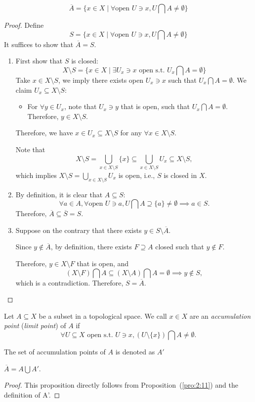 \begin{proposition}\label{pro:2:11}
\[
\overline{A}=\{x\in X\mid\forall \text{open }U\ni x, U\bigcap A\ne\emptyset\}
\]
\end{proposition}
\begin{proof}
Define
\[
S=\{x\in X\mid\forall \text{open }U\ni x, U\bigcap A\ne\emptyset\}
\]
It suffices to show that $\overline{A}=S$.
\begin{enumerate}
\item
First show that $S$ is closed:
\[
X\setminus S=\{x\in X\mid\exists U_x\ni x\text{ open s.t. }U_x\bigcap A=\emptyset\}
\]
Take $x\in X\setminus S$, we imply there exists open $U_x\ni x$ such that $U_x\bigcap A=\emptyset$. We claim $U_x\subseteq X\setminus S$:
\begin{itemize}
\item
For $\forall y\in U_x$, note that $U_x\ni y$ that is open, such that $U_x\bigcap A=\emptyset$. Therefore, $y\in X\setminus S$.
\end{itemize}

Therefore, we have $x\in U_x\subseteq X\setminus S$ for any $\forall x\in X\setminus S$.

Note that
\[
X\setminus S
=
\bigcup_{x\in X\setminus S}\{x\}\subseteq
\bigcup_{x\in X\setminus S}U_x\subseteq X\setminus S,
\]
which implies $X\setminus S=\bigcup_{x\in X\setminus S}U_x$ is open, i.e., $S$ is closed in $X$.
\item
By definition, it is clear that $A\subseteq S$:
\[
\forall a\in A,\forall\text{open }U\ni a,
U\bigcap A\supseteq\{a\}\ne\emptyset\implies a\in S.
\]
Therefore, $\overline{A}\subseteq\overline{S}=S$.
\item
Suppose on the contrary that 
there exists $y\in S\setminus\overline{A}$. 

Since $y\notin\overline{A}$, by definition, 
there exists $F\supseteq A$ closed such that 
$y\notin F$. 

Therefore, $y\in X\setminus F$ that is open, and 
\[
(X\setminus F)\bigcap A\subseteq(X\setminus A)\bigcap A=\emptyset\implies y\notin S,
\]
which is a contradiction. Therefore, $S=\overline{A}$.
\end{enumerate}
\end{proof}
\begin{definition}
Let $A\subseteq X$ be a subset in a topological space. 
We call $x\in X$ are an 
\emph{accumulation point} (\emph{limit point}) of $A$ 
if
\[
\forall U\subseteq X\text{ open s.t. }
U\ni x, 
(U\setminus\{x\})\bigcap A\ne\emptyset.
\]

The set of accumulation points of $A$ is denoted as $A'$
\end{definition}
\begin{proposition}
$\overline{A}=A\bigcup A'$.
\end{proposition}

\begin{proof}
This proposition directly follows from Proposition~(\ref{pro:2:11}) and the definition of A'.
\end{proof}











